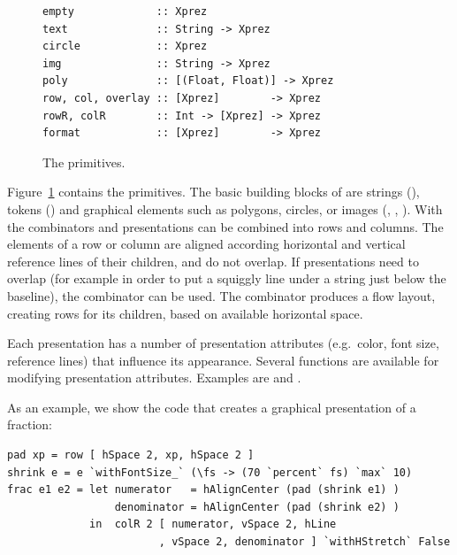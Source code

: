 \documentclass[12pt]{article}
\begin{document}
\begin{figure}
\begin{footnotesize}
\begin{center}
\begin{footnotesize}
\begin{verbatim}
empty             :: Xprez
text              :: String -> Xprez             
circle            :: Xprez                       
img               :: String -> Xprez             
poly              :: [(Float, Float)] -> Xprez 
row, col, overlay :: [Xprez]        -> Xprez          
rowR, colR        :: Int -> [Xprez] -> Xprez   
format            :: [Xprez]        -> Xprez
\end{verbatim}
\end{footnotesize}
\caption{The {\Xprez} primitives.} \label{fig:xprezPrim} 
\end{center}
\end{footnotesize}
\end{figure}

Figure~\ref{fig:xprezPrim} contains the \Xprez primitives. The basic building blocks of \Xprez are strings (), tokens () and graphical elements such as polygons, circles, or images (, , ). With the combinators  and  presentations can be combined into rows and columns. The elements of a row or column are aligned according horizontal and vertical reference lines of their children, and do not overlap. If presentations need to overlap (for example in order to put a squiggly line under a string just below the baseline), the  combinator can be used. The  combinator produces a flow layout, creating rows for its children, based on available horizontal space.

Each presentation has a number of presentation attributes (e.g.\ color, font size, reference lines) that influence its appearance. Several functions are available for modifying presentation attributes. Examples are  and . 


As an example, we show the \Xprez code that creates a graphical presentation of a fraction:

\begin{footnotesize}
\begin{verbatim}
pad xp = row [ hSpace 2, xp, hSpace 2 ]
shrink e = e `withFontSize_` (\fs -> (70 `percent` fs) `max` 10)
frac e1 e2 = let numerator   = hAlignCenter (pad (shrink e1) )
                 denominator = hAlignCenter (pad (shrink e2) )
             in  colR 2 [ numerator, vSpace 2, hLine
                        , vSpace 2, denominator ] `withHStretch` False
\end{verbatim}
\end{footnotesize}
\end{document}
